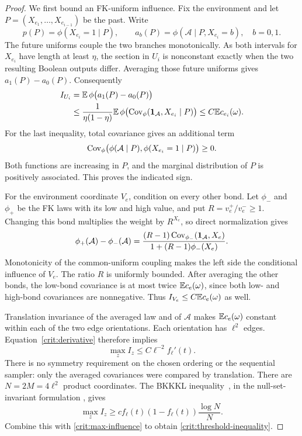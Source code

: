 \begin{proof}
We first bound an FK-uniform influence.  Fix the environment and let
$P=(X_{e_1},\ldots,X_{e_{i-1}})$ be the past.  Write
\[
 p(P)=\phi(X_{e_i}=1\mid P),\qquad
 a_b(P)=\phi(\mathcal A\mid P,X_{e_i}=b),\quad b=0,1.
\]
The future uniforms couple the two branches monotonically.  As both
intervals for $X_{e_i}$ have length at least $\eta$, the section in
$U_i$ is nonconstant exactly when the two resulting Boolean outputs
differ.  Averaging those future uniforms gives $a_1(P)-a_0(P)$.
Consequently
\begin{align}
 I_{U_i}
 &=\mathbb E\,\phi\bigl(a_1(P)-a_0(P)\bigr)\nonumber\\
 &\le\frac{1}{\eta(1-\eta)}
       \mathbb E\,\phi\bigl(\operatorname{Cov}_\phi(\mathbf 1_{\mathcal A},X_{e_i}\mid P)\bigr)
 \le C\mathbb E c_{e_i}(\omega).\label{crit:uniform-influence}
\end{align}
For the last inequality, total covariance gives an additional term
\[
 \operatorname{Cov}_\phi\bigl(\phi(\mathcal A\mid P),
                        \phi(X_{e_i}=1\mid P)\bigr)\ge0.
\]
Both functions are increasing in $P$, and the marginal distribution
of $P$ is positively associated.  This proves the indicated sign.

For the environment coordinate $V_e$, condition on every other bond.
Let $\phi_-$ and $\phi_+$ be the FK laws with its low and high value,
and put $R=v_e^+/v_e^-\ge1$.  Changing this bond multiplies the weight
by $R^{X_e}$, so direct normalization gives
\begin{equation}\label{crit:bond-tilt}
 \phi_+(\mathcal A)-\phi_-(\mathcal A)
 =\frac{(R-1)\operatorname{Cov}_{\phi_-}(\mathbf 1_{\mathcal A},X_e)}
              {1+(R-1)\phi_-(X_e)}.
\end{equation}
Monotonicity of the common-uniform coupling makes the left side the
conditional influence of $V_e$.  The ratio $R$ is uniformly bounded.
After averaging the other bonds, the low-bond covariance is at most
twice $\mathbb E c_e(\omega)$, since both low- and high-bond covariances are
nonnegative.  Thus $I_{V_e}\le C\mathbb E c_e(\omega)$ as well.

Translation invariance of the averaged law and of $\mathcal A$ makes
$\mathbb E c_e(\omega)$ constant within each of the two edge orientations.
Each orientation has $\ell^2$ edges.  Equation~\eqref{crit:derivative}
therefore implies
\begin{equation}\label{crit:max-influence}
 \max_z I_z\le C\ell^{-2}f_\ell'(t).
\end{equation}
There is no symmetry requirement on the chosen ordering or the
sequential sampler: only the averaged covariances were compared by
translation.  There are $N=2M=4\ell^2$ product coordinates.  The BKKKL
inequality~\cite{BKKKL1992}, in the null-set-invariant formulation
\cite[Theorem~2.3 and Equation~(2.3)]{GJN2013}, gives
\[
 \max_z I_z\ge c f_\ell(t)(1-f_\ell(t))\frac{\log N}{N}.
\]
Combine this with \eqref{crit:max-influence} to obtain
\eqref{crit:threshold-inequality}.
\end{proof}

